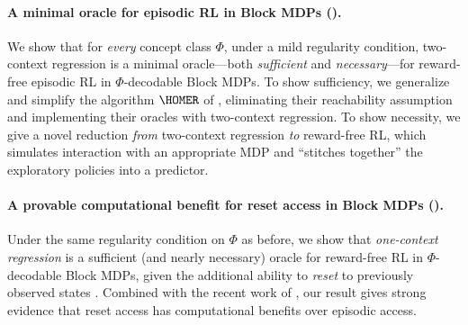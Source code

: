 \paragraph{A minimal oracle for episodic RL in Block MDPs ().} We show that for \emph{every} concept class $\Phi$, under a mild regularity condition, two-context regression is a minimal oracle---both \emph{sufficient} and \emph{necessary}---for reward-free episodic RL in $\Phi$-decodable Block MDPs. To show sufficiency, we generalize and simplify the algorithm $\HOMER$ of \cite{misra2020kinematic}, eliminating their reachability assumption and implementing their oracles with two-context regression. To show necessity, we give a novel reduction \emph{from} two-context regression \emph{to} reward-free RL, which simulates interaction with an appropriate MDP and ``stitches together'' the exploratory policies into a predictor. %


\paragraph{A provable computational benefit for reset access in Block MDPs ().} Under the same regularity condition on $\Phi$ as before, we show that \emph{one-context regression} is a sufficient (and nearly necessary) oracle for reward-free RL in $\Phi$-decodable Block MDPs, given the additional ability to \emph{reset} to previously observed states \citep{li2021sample,yin2022efficient,
  mhammedi2024power}. Combined with the recent work of \cite{golowich2024exploration}, our result gives strong evidence that reset access has computational benefits over episodic access. %

